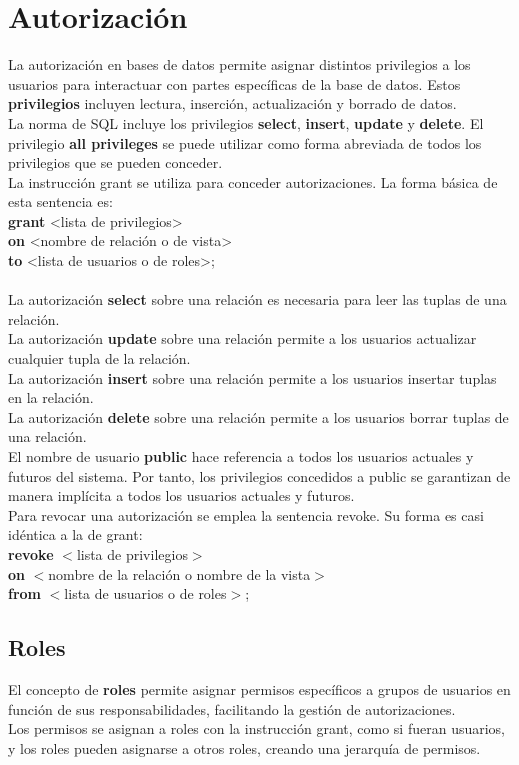 \documentclass{article}
\begin{document}
\section{Autorización}
La autorización en bases de datos permite asignar distintos privilegios a los usuarios para interactuar con partes específicas de la base de datos. Estos \textbf{privilegios} incluyen lectura, inserción, actualización y borrado de datos. \\
La norma de SQL incluye los privilegios \textbf{select}, \textbf{insert}, \textbf{update} y
\textbf{delete}. El privilegio \textbf{all privileges} se puede utilizar como forma
abreviada de todos los privilegios que se pueden conceder. \\
La instrucción grant se utiliza para conceder autorizaciones. La forma básica de esta sentencia es: \\
\textbf{grant} <lista de privilegios> \\
\textbf{on} <nombre de relación o de vista> \\
\textbf{to} <lista de usuarios o de roles>; \\
\\
La autorización \textbf{select} sobre una relación es necesaria para leer las tuplas de una relación. \\
La autorización \textbf{update} sobre una relación permite a los usuarios actualizar cualquier tupla de la relación. \\
La autorización \textbf{insert} sobre una relación permite a los usuarios insertar tuplas en la relación. \\
La autorización \textbf{delete} sobre una relación permite a los usuarios borrar tuplas de una relación. \\
El nombre de usuario \textbf{public} hace referencia a todos los usuarios actuales y futuros del sistema. Por tanto, los privilegios concedidos a public se garantizan de manera implícita a todos los usuarios actuales y futuros. \\
Para revocar una autorización se emplea la sentencia revoke. Su forma es casi idéntica a la de grant: \\
\textbf{revoke} $<$lista de privilegios$>$ \\
\textbf{on} $<$nombre de la relación o nombre de la vista$>$ \\
\textbf{from} $<$lista de usuarios o de roles$>$; 

\subsection{Roles}
El concepto de \textbf{roles} permite asignar permisos específicos a grupos de usuarios en función de sus responsabilidades, facilitando la gestión de autorizaciones. \\
Los permisos se asignan a roles con la instrucción grant, como si fueran usuarios, y los roles pueden asignarse a otros roles, creando una jerarquía de permisos. 
\end{document}
